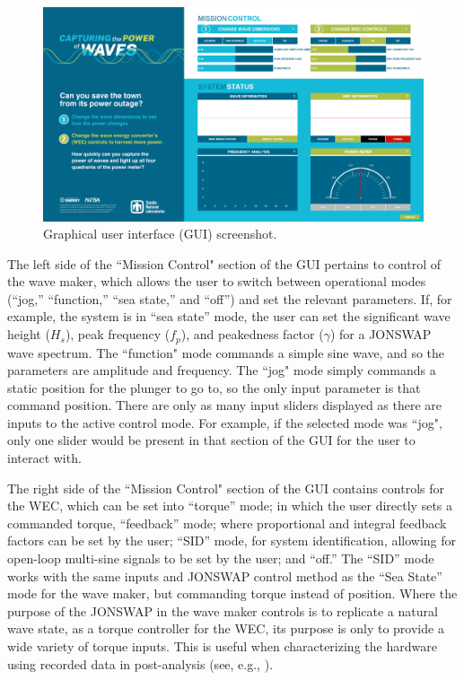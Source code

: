 \documentclass[hardware,article,submit,pdftex,moreauthors]{Definitions/mdpi}
\begin{document}
\begin{figure}[tb]
  \centering
  \includegraphics[width=1\textwidth]{diagrams/siweed_guiScreenShot.png}
  \caption{Graphical user interface (GUI) screenshot.}
  \label{fig:siweed_guiScreenShot}
\end{figure}

The left side of the ``Mission Control" section of the GUI pertains to control of the wave maker, which allows the user to switch between operational modes (``jog,'' ``function,'' ``sea state,'' and ``off'') and set the relevant parameters.
If, for example, the system is in ``sea state'' mode, the user can set the significant wave height ($H_s$), peak frequency ($f_p$), and peakedness factor ($\gamma$) for a JONSWAP wave spectrum.
The ``function" mode commands a simple sine wave, and so the parameters are amplitude and frequency. 
The ``jog" mode simply commands a static position for the plunger to go to, so the only input parameter is that command position.
There are only as many input sliders displayed as there are inputs to the active control mode. 
For example, if the selected mode was ``jog", only one slider would be present in that section of the GUI for the user to interact with.

The right side of the ``Mission Control" section of the GUI contains controls for the WEC, which can be set into ``torque'' mode; in which the user directly sets a commanded torque, ``feedback'' mode; where proportional and integral feedback factors can be set by the user; ``SID'' mode, for system identification, allowing for open-loop multi-sine signals to be set by the user; and ``off.''
The ``SID'' mode works with the same inputs and JONSWAP control method as the ``Sea State'' mode for the wave maker, but commanding torque instead of position.
Where the purpose of the JONSWAP in the wave maker controls is to replicate a natural wave state, as a torque controller for the WEC, its purpose is only to provide a wide variety of torque inputs. 
This is useful when characterizing the hardware using recorded data in post-analysis (see, e.g., \cite{Bacelli2017a}).
\end{document}
